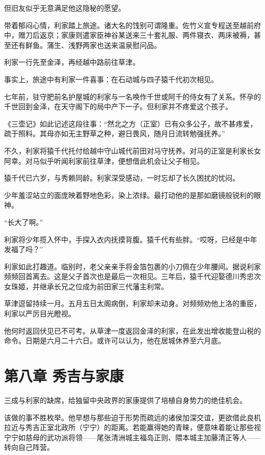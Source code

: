 \documentclass[
]{article}
\begin{document}
但旧友似乎无意满足他这隐秘的愿望。

带着郁闷心情，利家踏上旅途。诸大名的饯别可谓隆重。佐竹义宣专程送至越前府中，赠刀后返京；家康则遣家臣神谷某送来三十套礼服、两件寝衣、两床被褥，甚至还有鲜鱼。蒲生、浅野两家也送来温泉慰问品。

利家一行先至金泽，再经越中路前往草津。

事实上，旅途中有利家一件喜事：在石动城与四子猿千代初次相见。

七年前，驻守肥前名护屋城的利家与一名唤作千世或阿千的侍女有了关系。怀孕的千世回到金泽，在天守阁下的局中产下一子。但利家并不疼爱这个孩子。

《三壶记》如此记述这段往事：``然北之方（正室）已有众多公子，故不甚疼爱，疏于照料。其母亦如无主野草之种，避日畏风，随月日流转勉强抚养。''

不久，利家将猿千代托付给越中守山城代前田对马守抚养。对马的正室是利家长女阿幸。对马似乎听闻利家前往草津，便想借此机会让父子相见。

猿千代已六岁，与秀赖同龄。利家深受感动，一时忘却了长久困扰的忧闷。

少年羞涩站立的面庞映着野地色彩，染上浓绿。最打动他的是那如磨镜般锐利的眼神。

``长大了啊。''

利家将少年揽入怀中，手探入衣内抚摸背腹。猿千代有些胖。``哎呀，已经是中年发福了吗？''

利家如此打趣道。临别时，老父亲亲手将金箔包裹的小刀佩在少年腰间。据说利家频频回首离去。这是父子首次也是最后一次相见。三年后，猿千代迎娶德川秀忠次女珠姬，并继承长兄之位成为前田家三代藩主利常。

草津逗留持续一月。五月五日太阁病倒，利家却未动身。对频频劝他上洛的重臣，利家以严厉目光瞪视。

他何时返回伏见已不可考。从草津一度返回金泽的利家，在此发出增收能登山税的命令。日期是六月二十六日。或许可以认为，他在居城休养至六月底。

\section*{第八章 秀吉与家康}\label{ux7b2cux516bux7ae0-ux79c0ux5409ux4e0eux5bb6ux5eb7}

三成与利家的缺席，给独留中央政界的家康提供了培植自身势力的绝佳机会。

该做的事不胜枚举。他早想与那些迫于形势而疏远的诸侯加深交谊，更欲借此良机拉近与秀吉正室北政所（宁宁）的距离。若能赢得她的青睐，便意味着能让那些视宁宁如慈母的武功派将领------尾张清洲城主福岛正则、隈本城主加藤清正等人------转向自己阵营。
\end{document}
